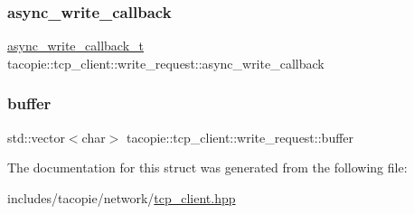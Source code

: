 \subsubsection{\texorpdfstring{async\+\_\+write\+\_\+callback}{async\_write\_callback}}
{\footnotesize\ttfamily \hyperlink{classtacopie_1_1tcp__client_ad48b8c8dff8a77490eb2e3e802c82b97}{async\+\_\+write\+\_\+callback\+\_\+t} tacopie\+::tcp\+\_\+client\+::write\+\_\+request\+::async\+\_\+write\+\_\+callback}

\mbox{\label{structtacopie_1_1tcp__client_1_1write__request_a4ee0c159b630c14f81d6b6d7d4b4e826}} 
\subsubsection{\texorpdfstring{buffer}{buffer}}
{\footnotesize\ttfamily std\+::vector$<$char$>$ tacopie\+::tcp\+\_\+client\+::write\+\_\+request\+::buffer}



The documentation for this struct was generated from the following file\+:\begin{DoxyCompactItemize}
\item 
includes/tacopie/network/\hyperlink{tcp__client_8hpp}{tcp\+\_\+client.\+hpp}\end{DoxyCompactItemize}
